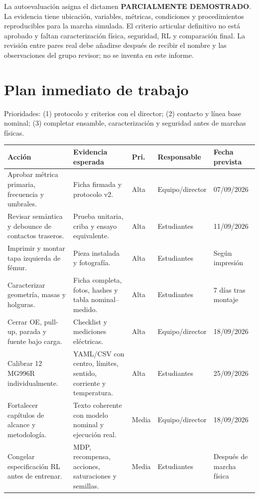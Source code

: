 \documentclass[11pt,letterpaper]{article}
\begin{document}
La autoevaluación asigna el dictamen \textbf{PARCIALMENTE DEMOSTRADO}. La
evidencia tiene ubicación, variables, métricas, condiciones y procedimientos
reproducibles para la marcha simulada. El criterio articular definitivo no está
aprobado y faltan caracterización física, seguridad, RL y comparación final.
La revisión entre pares real debe añadirse después de recibir el nombre y las
observaciones del grupo revisor; no se inventa en este informe.

\section{Plan inmediato de trabajo}

Prioridades: (1) protocolo y criterios con el director; (2) contacto y línea
base nominal; (3) completar ensamble, caracterización y seguridad antes de
marchas físicas.

\small
\begin{longtable}{p{5.1cm}p{4.4cm}p{1.5cm}p{2.4cm}p{2.2cm}}
\toprule
\textbf{Acción} & \textbf{Evidencia esperada} & \textbf{Pri.} & \textbf{Responsable} & \textbf{Fecha prevista}\\
\midrule
Aprobar métrica primaria, frecuencia y umbrales. & Ficha firmada y protocolo v2. & Alta & Equipo/director & 07/09/2026\\
Revisar semántica y debounce de contactos traseros. & Prueba unitaria, criba y ensayo equivalente. & Alta & Estudiantes & 11/09/2026\\
Imprimir y montar tapa izquierda de fémur. & Pieza instalada y fotografía. & Alta & Estudiantes & Según impresión\\
Caracterizar geometría, masas y holguras. & Ficha completa, fotos, hashes y tabla nominal--medido. & Alta & Estudiantes & 7 días tras montaje\\
Cerrar OE, pull-up, parada y fuente bajo carga. & Checklist y mediciones eléctricas. & Alta & Equipo/director & 18/09/2026\\
Calibrar 12 MG996R individualmente. & YAML/CSV con centro, límites, sentido, corriente y temperatura. & Alta & Estudiantes & 25/09/2026\\
Fortalecer capítulos de alcance y metodología. & Texto coherente con modelo nominal y ejecución real. & Media & Equipo/director & 18/09/2026\\
Congelar especificación RL antes de entrenar. & MDP, recompensa, acciones, saturaciones y semillas. & Media & Estudiantes & Después de marcha física\\
\bottomrule
\end{longtable}
\normalsize
\end{document}
